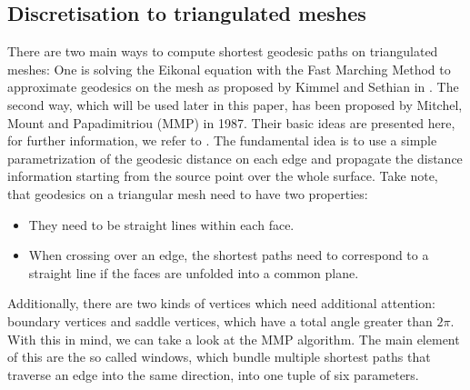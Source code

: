\subsection*{Discretisation to triangulated meshes}
There are two main ways to compute shortest geodesic paths on triangulated meshes:
One is solving the Eikonal equation with the Fast Marching Method to approximate geodesics on the mesh as proposed by Kimmel and Sethian in \cite{kimmel1998computing}.
The second way, which will be used later in this paper, has been proposed by Mitchel, Mount and Papadimitriou (MMP) in 1987.
Their basic ideas are presented here, for further information, we refer to \cite{surazhsky2005fast}.
The fundamental idea is to use a simple parametrization of the geodesic distance on each edge and propagate the distance information starting from the source point over the whole surface.
Take note, that geodesics on a triangular mesh need to have two properties:
\begin{itemize}
	\item They need to be straight lines within each face.
	\item When crossing over an edge, the shortest paths need to correspond to a straight line if the faces are unfolded into a common plane.
\end{itemize}
Additionally, there are two kinds of vertices which need additional attention: boundary vertices and saddle vertices, which have a total angle greater than $2\pi$.
With this in mind, we can take a look at the MMP algorithm.
The main element of this are the so called windows, which bundle multiple shortest paths that traverse an edge into the same direction, into one tuple of six parameters.

